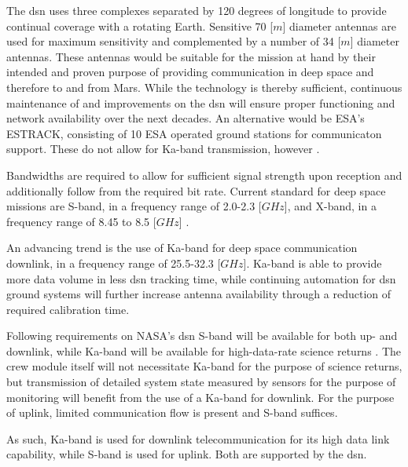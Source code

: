 The \gls{dsn} uses three complexes separated by 120 degrees of longitude to provide continual coverage with a rotating Earth. Sensitive 70 [$m$] diameter antennas are used for maximum sensitivity and complemented by a number of 34 [$m$] diameter antennas. \cite{Wertz2011} These antennas would be suitable for the mission at hand by their intended and proven purpose of providing communication in deep space and therefore to and from Mars. While the technology is thereby sufficient, continuous maintenance of and improvements on the \gls{dsn} will ensure proper functioning and network availability over the next decades. An alternative would be ESA's ESTRACK, consisting of 10 ESA operated ground stations for communicaton support. These do not allow for Ka-band transmission, however \cite{Wertz2011}.

Bandwidths are required to allow for sufficient signal strength upon reception and additionally follow from the required bit rate. Current standard for deep space missions are S-band, in a frequency range of 2.0-2.3 [$GHz$], and X-band, in a frequency range of 8.45 to 8.5 [$GHz$] \cite{Wertz2011}.

An advancing trend is the use of Ka-band for deep space communication downlink, in a frequency range of 25.5-32.3 [$GHz$]. Ka-band is able to provide more data volume in less \gls{dsn} tracking time, while continuing automation for \gls{dsn} ground systems will further increase antenna availability through a reduction of required calibration time\cite{Edwards1999}. 

Following requirements on NASA's \gls{dsn} S-band will be available for both up- and downlink, while Ka-band will be available for high-data-rate science returns \cite{Labelle2012}. The crew module itself will not necessitate Ka-band for the purpose of science returns, but transmission of detailed system state measured by sensors for the purpose of monitoring will benefit from the use of a Ka-band for downlink. For the purpose of uplink, limited communication flow is present and S-band suffices.%

As such, Ka-band is used for downlink telecommunication for its high data link capability, while S-band is used for uplink. Both are supported by the \gls{dsn}.
